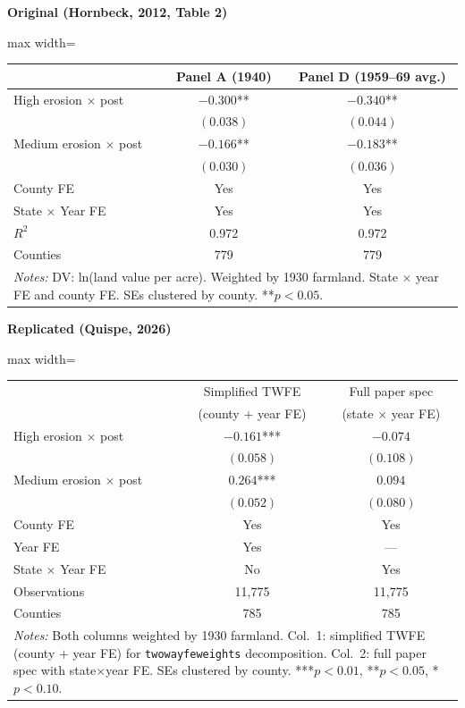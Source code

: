 \documentclass[11pt,a4paper]{article}
\begin{document}
\vspace{0.5cm}
\begin{minipage}[t]{0.48\textwidth}
\centering
\textbf{\large Original (Hornbeck, 2012, Table 2)}
\vspace{0.3cm}

\begin{adjustbox}{max width=\textwidth}
\begin{tabular}{lcc}
\toprule
 & Panel A (1940) & Panel D (1959--69 avg.) \\
\midrule
High erosion $\times$ post & $-0.300$** & $-0.340$** \\
 & $(0.038)$ & $(0.044)$ \\[0.3em]
Medium erosion $\times$ post & $-0.166$** & $-0.183$** \\
 & $(0.030)$ & $(0.036)$ \\[0.3em]
\midrule
County FE & Yes & Yes \\
State $\times$ Year FE & Yes & Yes \\
$R^2$ & 0.972 & 0.972 \\
Counties & 779 & 779 \\
\bottomrule
\multicolumn{3}{p{0.85\textwidth}}{\footnotesize\textit{Notes:} DV: ln(land value per acre). Weighted by 1930 farmland. State $\times$ year FE and county FE. SEs clustered by county. **$p<0.05$.}
\end{tabular}
\end{adjustbox}
\end{minipage}%
\hfill
\begin{minipage}[t]{0.48\textwidth}
\centering
\textbf{\large Replicated (Quispe, 2026)}
\vspace{0.3cm}

\begin{adjustbox}{max width=\textwidth}
\begin{tabular}{lcc}
\toprule
 & Simplified TWFE & Full paper spec \\
 & (county $+$ year FE) & (state $\times$ year FE) \\
\midrule
High erosion $\times$ post & $-0.161$*** & $-0.074$ \\
 & $(0.058)$ & $(0.108)$ \\[0.3em]
Medium erosion $\times$ post & $0.264$*** & $0.094$ \\
 & $(0.052)$ & $(0.080)$ \\[0.3em]
\midrule
County FE & Yes & Yes \\
Year FE & Yes & --- \\
State $\times$ Year FE & No & Yes \\
Observations & 11,775 & 11,775 \\
Counties & 785 & 785 \\
\bottomrule
\multicolumn{3}{p{0.85\textwidth}}{\footnotesize\textit{Notes:} Both columns weighted by 1930 farmland. Col.\ 1: simplified TWFE (county $+$ year FE) for \texttt{twowayfeweights} decomposition. Col.\ 2: full paper spec with state$\times$year FE. SEs clustered by county. ***$p<0.01$, **$p<0.05$, *$p<0.10$.}
\end{tabular}
\end{adjustbox}
\end{minipage}
\end{document}
